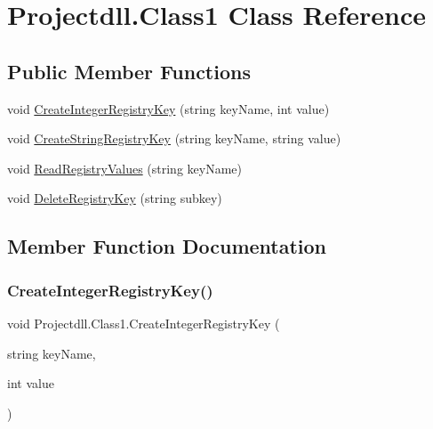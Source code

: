 \hypertarget{class_projectdll_1_1_class1}{}\section{Projectdll.\+Class1 Class Reference}
\label{class_projectdll_1_1_class1}
\subsection*{Public Member Functions}
\begin{DoxyCompactItemize}
\item 
void \hyperlink{class_projectdll_1_1_class1_aa645947dfed4d7fdc1c60d34b22d0015}{Create\+Integer\+Registry\+Key} (string key\+Name, int value)
\item 
void \hyperlink{class_projectdll_1_1_class1_adb37c9e1c9992940f14ffc639225d084}{Create\+String\+Registry\+Key} (string key\+Name, string value)
\item 
void \hyperlink{class_projectdll_1_1_class1_a7f3c2167cf4ca17f248b95f364e42294}{Read\+Registry\+Values} (string key\+Name)
\item 
void \hyperlink{class_projectdll_1_1_class1_abafd55b942eae3aef08fd4d1fb722d81}{Delete\+Registry\+Key} (string subkey)
\end{DoxyCompactItemize}


\subsection{Member Function Documentation}
\mbox{\label{class_projectdll_1_1_class1_aa645947dfed4d7fdc1c60d34b22d0015}} 
\subsubsection{\texorpdfstring{Create\+Integer\+Registry\+Key()}{CreateIntegerRegistryKey()}}
{\footnotesize\ttfamily void Projectdll.\+Class1.\+Create\+Integer\+Registry\+Key (\begin{DoxyParamCaption}\item[{string}]{key\+Name,  }\item[{int}]{value }\end{DoxyParamCaption})}

